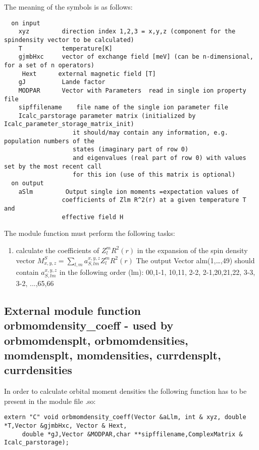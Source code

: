 The meaning of the symbols is as follows:
{\footnotesize
\begin{verbatim}
  on input
    xyz         direction index 1,2,3 = x,y,z (component for the spindensity vector to be calculated)
    T           temperature[K]
    gjmbHxc     vector of exchange field [meV] (can be n-dimensional, for a set of n operators)
     Hext      external magnetic field [T]
    gJ          Lande factor
    MODPAR      Vector with Parameters  read in single ion property file
    sipffilename    file name of the single ion parameter file
    Icalc_parstorage parameter matrix (initialized by Icalc_parameter_storage_matrix_init)
                   it should/may contain any information, e.g. population numbers of the
				   states (imaginary part of row 0)
                   and eigenvalues (real part of row 0) with values set by the most recent call
                   for this ion (use of this matrix is optional)
  on output
    aSlm         Output single ion moments =expectation values of
                coefficients of Zlm R^2(r) at a given temperature T and
                effective field H
\end{verbatim}
}

The module function must perform the following tasks:
\begin{enumerate}
\item calculate the coefficients of $Z_l^m R^2(r)$ in the expansion of
      the spin density vector $M^S_{x,y,z}=\sum_{l,m} a^{x,y,z}_{S,lm} Z_l^m R^2(r)$
      The output Vector alm(1,\dots,49) should contain  $a^{x,y,z}_{S,lm}$
      in the following order (lm):  00,1-1, 10,11, 2-2, 2-1,20,21,22, 3-3, 3-2, ...,65,66
\end{enumerate}

\subsection{External module function {\prg orbmomdensity\_coeff} -
used by {\prg orbmomdensplt},
{\prg orbmomdensities},
{\prg momdensplt},
{\prg momdensities},
{\prg currdensplt},
{\prg currdensities}
}

In order to calculate orbital moment densities
the following function has to be
present in the module file {\prg *.so}:

\begin{verbatim}
extern "C" void orbmomdensity_coeff(Vector &aLlm, int & xyz, double *T,Vector &gjmbHxc, Vector & Hext,
     double *gJ,Vector &MODPAR,char **sipffilename,ComplexMatrix & Icalc_parstorage);
\end{verbatim}

